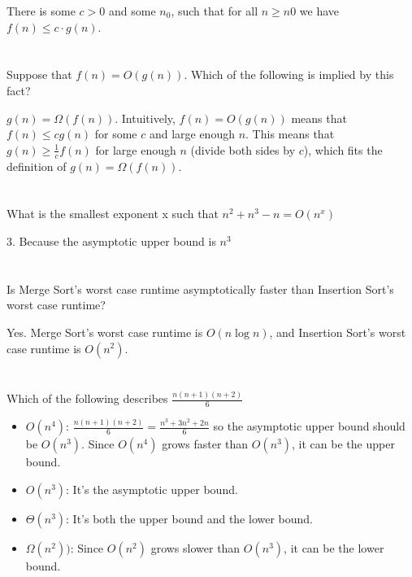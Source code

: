 \documentclass [12pt]{article}
\begin{document}
\begin{Solution}
There is some $c > 0$ and some $n_0$, such that for all $n \geq n0$ we have $f (n) \leq c \cdot g(n)$.
\end{Solution}


\section{} Suppose that $f (n) = O(g(n))$. Which of the following is implied by this fact?

\begin{Solution}
$g(n) = \Omega(f(n))$. Intuitively, $f(n) = O(g(n))$ means that $f(n) \leq c g(n)$ for some $c$ and large enough $n$. This means that $g(n) \geq \frac{1}{c} f(n)$ for large enough $n$ (divide both sides by $c$), which fits the definition of $g(n) = \Omega(f(n))$.
\end{Solution}


\section{} What is the smallest exponent x such that $n^2 + n^3 - n = O(n^x)$

\begin{Solution}
3. Because the asymptotic upper bound is $n^3$
\end{Solution}


\section{} Is Merge Sort’s worst case runtime asymptotically faster than Insertion Sort’s worst case runtime?

\begin{Solution}
Yes. Merge Sort’s worst case runtime is $O(n \log n)$, and Insertion Sort’s worst case runtime is $O(n^2)$.
\end{Solution}


\section{} Which of the following describes $\frac{n(n+1)(n+2)}{6}$

\begin{Solution}

\begin{itemize}
    \item {$O(n^4)$:}  $\frac{n(n+1)(n+2)}{6} = \frac{n^3 + 3n^2 + 2n}{6}$ so the asymptotic upper bound should be $O(n^3)$. Since $O(n^4)$ grows faster than $O(n^3)$, it can be the upper bound.
    \item {$O(n^3)$:} It's the asymptotic upper bound.
    \item {$\Theta(n^3)$:} It's both the upper bound and the lower bound.
    \item {$\Omega(n^2))$:} Since $O(n^2)$ grows slower than $O(n^3)$, it can be the lower bound.
\end{itemize}

\end{Solution}
\end{document}
